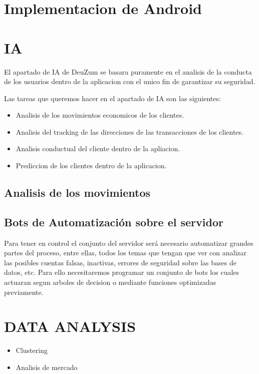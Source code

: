 \documentclass{article}
\theoremstyle{definition}
\begin{document}
\section{Implementacion de Android}




\section{IA}

El apartado de IA de DeuZum se basara puramente en el analisis de la conducta de los usuarios dentro de la aplicacion con el unico fin de garantizar su seguridad.

Las tareas que queremos hacer en el apartado de IA son las siguientes:

\begin{itemize}
    \item Analisis de los movimientos economicos de los clientes.
    \item Analisis del tracking de las direcciones de las transacciones de los clientes.
    \item Analisis conductual del cliente dentro de la apliacion.
    \item Prediccion de los clientes dentro de la aplicacion.
\end{itemize}


\subsection{Analisis de los movimientos}

\subsection{Bots de Automatización sobre el servidor}

Para tener en control el conjunto del servidor será necesario automatizar grandes partes del proceso, entre ellas, todos los temas que tengan que ver con analizar las posibles cuentas falsas, inactivas, errores de seguridad sobre las bases de datos, etc. Para ello necesitaremos programar un conjunto de bots los cuales actuaran segun arboles de decision o mediante funciones optimizadas previamente.

\section{DATA ANALYSIS}

\begin{itemize}
    \item Clustering
    \item Analisis de mercado
\end{itemize}
\end{document}
